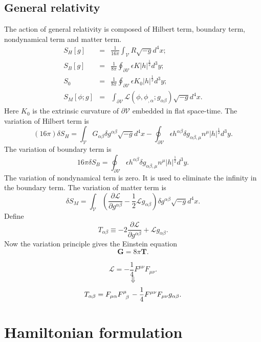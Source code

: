 \subsection{General relativity}
The action of general relativity is composed of Hilbert term, boundary term, nondynamical term and matter term.
\begin{eqnarray}
    S_{H}[g] &=& \frac{1}{16\pi} \int_{\mathcal{V}} R \sqrt{-g} d^4 x; \nonumber \\
    S_{B}[g] &=& \frac{1}{8 \pi} \oint_{\partial \mathcal{V}} \epsilon K |h|^{\frac{1}{2}} d^3 y ; \nonumber \\
    S_0 &=& \frac{1}{8\pi} \oint_{\partial \mathcal{V}} \epsilon K_0 |h|^{\frac{1}{2}} d^3 y ; \nonumber \\
    S_M[\phi;g] &=& \int_{\partial \mathcal{V}} \mathcal{L}(\phi,\phi_{,\alpha};g_{\alpha \beta}) \sqrt{-g} d^4 x . \nonumber
\end{eqnarray}
Here $K_0$ is the extrinsic curvature of $\partial \mathcal{V}$ embedded in flat space-time.
The variation of Hilbert term is
\[(16 \pi) \delta S_H = \int_{\mathcal{V}} G_{\alpha \beta} \delta g^{\alpha \beta} \sqrt{-g} d^4 x - \oint_{\partial \mathcal{V}} \epsilon h^{\alpha \beta} \delta g_{\alpha \beta, \mu} n^{\mu} |h|^{\frac{1}{2}} d^3 y.\]
The variation of boundary term is
\[16\pi \delta S_B = \oint_{\partial \mathcal{V}} \epsilon h^{\alpha \beta} \delta g_{\alpha \beta, \mu} n^{\mu} |h|^{\frac{1}{2}} d^3 y .\]
The variation of nondynamical tern is zero. It is used to eliminate the infinity in the boundary term.
The variation of matter term is
\[\delta S_M = \int_{\mathcal{V}} \left( \frac{\partial \mathcal{L}}{\partial g^{\alpha \beta}} - \frac{1}{2} \mathcal{L} g_{\alpha \beta} \right) \delta g^{\alpha \beta} \sqrt{-g} d^4 x.\]
Define
\[T_{\alpha \beta} \equiv -2 \frac{\partial \mathcal{L}}{\partial g^{\alpha \beta}} + \mathcal{L} g_{\alpha \beta}.\]
Now the variation principle gives the Einstein equation
\begin{equation}
    \bm{G} = 8\pi \bm{T}.
\end{equation}
\begin{example}
\[\mathcal{L} = -\frac{1}{4} F^{\mu \nu}F_{\mu \nu}.\]
\[\Downarrow\]
\[T_{\alpha \beta} = F_{\mu \alpha} \tensor{F}{^{\mu}_{ \beta}} - \frac{1}{4} F^{\mu \nu} F_{\mu \nu} g_{\alpha \beta}.\]
\end{example}

\section{Hamiltonian formulation}
